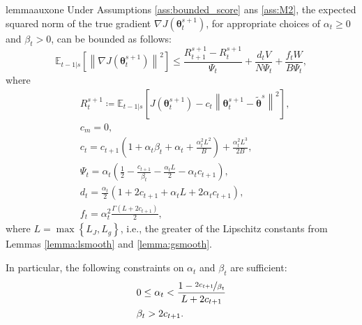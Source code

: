 \documentclass{article}
\makeatletter
\theoremstyle{remark}
\theoremstyle{definition}
\DeclareRobustCommand{\ie}{i.e.,\@\xspace}
\newcommand{\norm}[2][\infty]{\left\|#2\right\|_{#1}}
\newcommand{\vtheta}{\boldsymbol{\theta}}
\newcommand{\gradJ}[1]{\nabla J(#1)}
\newcommand{\Ets}[2][t]{\mathbb{E}_{#1\vert s}\left[#2\right]}
\newcommand{\wt}[1]{\widetilde{#1}}
\makeatother
\begin{document}
\begin{restatable}[]{lemma}{auxone}\label{lemma:aux1}
Under Assumptions \ref{ass:bounded_score} ans \ref{ass:M2}, the expected squared norm of the true gradient $\gradJ{\vtheta_t^{s+1}}$, for appropriate choices of $\alpha_t\geq0$ and $\beta_t>0$, can be bounded as follows:
\[
	\Ets[t-1]{\norm[]{\gradJ{\vtheta_t^{s+1}}}^2} \leq
	\frac{R_{t+1}^{s+1} - R_t^{s+1}}{\Psi_t} + \frac{d_tV}{N\Psi_t}
	+\frac{f_tW}{B\Psi_t},
\]
	where
\begin{align*}
	&R_t^{s+1}\coloneqq \Ets[t-1]{J(\vtheta_t^{s+1}) - c_t\norm[]{\vtheta_t^{s+1}-\wt{\vtheta}^s}^2}, \\
	&c_{m} = 0, \\
	&c_t = c_{t+1}\left(1+\alpha_t\beta_t+\alpha_t+\frac{\alpha_t^2L^2}{B}\right)+\frac{\alpha_t^2L^3}{2B}, \\
	&\Psi_t = \alpha_t\left(\frac{1}{2}-\frac{c_{t+1}}{\beta_t}-\frac{\alpha_tL}{2}-\alpha_tc_{t+1}\right), \\
	&d_t = \frac{\alpha_t}{2}\left(1+2c_{t+1}+\alpha_tL+2\alpha_tc_{t+1}\right), \\
	&f_t = \alpha_t^2\frac{\Gamma(L+2c_{t+1})}{2},
\end{align*}
where $L=\max\left\{L_J,L_g\right\}$, \ie the greater of the Lipschitz constants from Lemmas \ref{lemma:lsmooth} and \ref{lemma:gsmooth}.

In particular, the following constraints on $\alpha_t$ and $\beta_t$ are sufficient:
\begin{align*}
&0\leq\alpha_t < \frac{1-\nicefrac{2c_{t+1}}{\beta_t}}{L+2c_{t+1}} \\
&\beta_t > 2c_{t+1}.
\end{align*}
\end{restatable}
\end{document}
